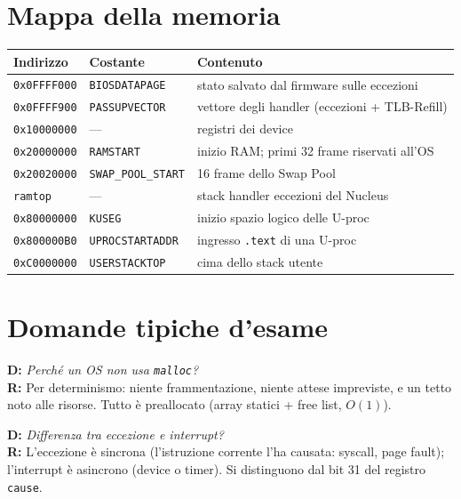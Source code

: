 \documentclass[11pt,a4paper]{article}
\newcommand{\code}[1]{\texttt{#1}}
\newcommand{\qbox}[2]{%
  \par\smallskip\noindent
  \textbf{\color{kw}D:} \emph{#1}\\
  \textbf{R:} #2\par\smallskip
}
\begin{document}
\section{Mappa della memoria}
\begin{center}
\begin{tabular}{@{}lll@{}}
\toprule
\textbf{Indirizzo} & \textbf{Costante} & \textbf{Contenuto} \\
\midrule
\code{0x0FFFF000} & \code{BIOSDATAPAGE} & stato salvato dal firmware sulle eccezioni \\
\code{0x0FFFF900} & \code{PASSUPVECTOR} & vettore degli handler (eccezioni + TLB-Refill) \\
\code{0x10000000} & --- & registri dei device \\
\code{0x20000000} & \code{RAMSTART} & inizio RAM; primi 32 frame riservati all'OS \\
\code{0x20020000} & \code{SWAP\_POOL\_START} & 16 frame dello Swap Pool \\
\code{ramtop}     & --- & stack handler eccezioni del Nucleus \\
\code{0x80000000} & \code{KUSEG} & inizio spazio logico delle U-proc \\
\code{0x800000B0} & \code{UPROCSTARTADDR} & ingresso \code{.text} di una U-proc \\
\code{0xC0000000} & \code{USERSTACKTOP} & cima dello stack utente \\
\bottomrule
\end{tabular}
\end{center}

\section{Domande tipiche d'esame}

\qbox{Perché un OS non usa \code{malloc}?}{Per determinismo: niente
frammentazione, niente attese impreviste, e un tetto noto alle risorse. Tutto è
preallocato (array statici + free list, $O(1)$).}

\qbox{Differenza tra eccezione e interrupt?}{L'eccezione è sincrona (l'istruzione
corrente l'ha causata: syscall, page fault); l'interrupt è asincrono (device o
timer). Si distinguono dal bit 31 del registro \code{cause}.}
\end{document}
